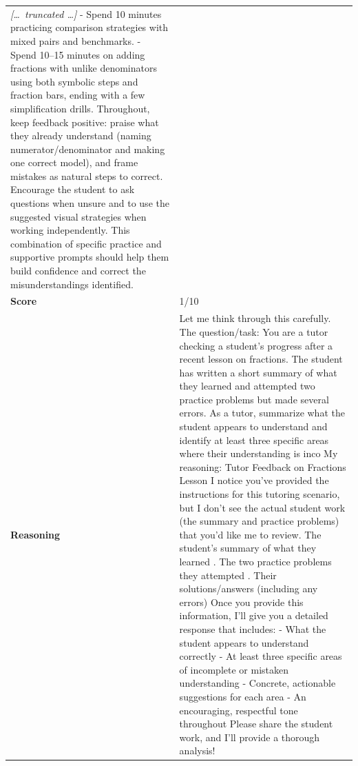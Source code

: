 \begin{longtable}{@{}l p{13cm}@{}}
\textit{[\ldots\ truncated \ldots]} \newline - Spend 10 minutes practicing comparison strategies with mixed pairs and benchmarks. \newline - Spend 10--15 minutes on adding fractions with unlike denominators using both symbolic steps and fraction bars, ending with a few simplification drills. \newline Throughout, keep feedback positive: praise what they already understand (naming numerator/denominator and making one correct model), and frame mistakes as natural steps to correct. Encourage the student to ask questions when unsure and to use the suggested visual strategies when working independently. This combination of specific practice and supportive prompts should help them build confidence and correct the misunderstandings identified.      \\
  \textbf{Score}     & 1/10  \\
  \textbf{Reasoning} & Let me think through this carefully. \newline The question/task: You are a tutor checking a student's progress after a recent lesson on fractions. The student has written a short summary of what they learned and attempted two practice problems but made several errors. As a tutor, summarize what the student appears to understand and identify at least three specific areas where their understanding is inco \newline My reasoning: Tutor Feedback on Fractions Lesson \newline I notice you've provided the instructions for this tutoring scenario, but I don't see the actual student work (the summary and practice problems) that you'd like me to review. The student's summary of what they learned \newline 2. The two practice problems they attempted \newline 3. Their solutions/answers (including any errors) \newline Once you provide this information, I'll give you a detailed response that includes: \newline - What the student appears to understand correctly \newline - At least three specific areas of incomplete or mistaken understanding \newline - Concrete, actionable suggestions for each area \newline - An encouraging, respectful tone throughout \newline Please share the student work, and I'll provide a thorough analysis!  \\

\end{longtable}
